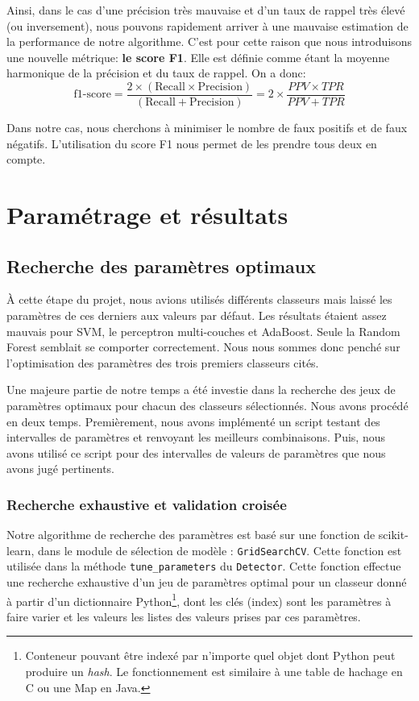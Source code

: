 \documentclass[a4paper]{report}
\begin{document}
\medskip
Ainsi, dans le cas d'une précision très mauvaise et d'un taux de rappel très élevé (ou inversement), nous pouvons rapidement arriver à une mauvaise estimation de la performance de notre algorithme. C'est pour cette raison que nous introduisons une nouvelle métrique: \textbf{le score F1}. Elle est définie comme étant la moyenne harmonique de la précision et du taux de rappel. On a donc:
\begin{equation}
	\text{f1-score} = \dfrac{2\times(\text{Recall} \times \text{Precision})}{(\text{Recall} + \text{Precision})} = 2\times\dfrac{PPV \times TPR}{PPV + TPR}
\end{equation}

Dans notre cas, nous cherchons à minimiser le nombre de faux positifs et de faux négatifs. L'utilisation du score F1 nous permet de les prendre tous deux en compte.

\chapter{Paramétrage et résultats}

\section{Recherche des paramètres optimaux}

À cette étape du projet, nous avions utilisés différents classeurs mais laissé les paramètres de ces derniers aux valeurs par défaut. Les résultats étaient assez mauvais pour SVM, le perceptron multi-couches et AdaBoost. Seule la Random Forest semblait se comporter correctement. Nous nous sommes donc penché sur l'optimisation des paramètres des trois premiers classeurs cités.

Une majeure partie de notre temps a été investie dans la recherche des jeux de paramètres optimaux pour chacun des classeurs sélectionnés. Nous avons procédé en deux temps. Premièrement, nous avons implémenté un script testant des intervalles de paramètres et renvoyant les meilleurs combinaisons. Puis, nous avons utilisé ce script pour des intervalles de valeurs de paramètres que nous avons jugé pertinents.

\subsection{Recherche exhaustive et validation croisée}

Notre algorithme de recherche des paramètres est basé sur une fonction de scikit-learn, dans le module de sélection de modèle : \texttt{GridSearchCV}. Cette fonction est utilisée dans la méthode \texttt{tune\_parameters} du \texttt{Detector}. Cette fonction effectue une recherche exhaustive d'un jeu de paramètres optimal pour un classeur donné à partir d'un dictionnaire Python\footnote{Conteneur pouvant être indexé par n'importe quel objet dont Python peut produire un \emph{hash}. Le fonctionnement est similaire à une table de hachage en C ou une Map en Java.}, dont les clés (index) sont les paramètres à faire varier et les valeurs les listes des valeurs prises par ces paramètres.
\end{document}
